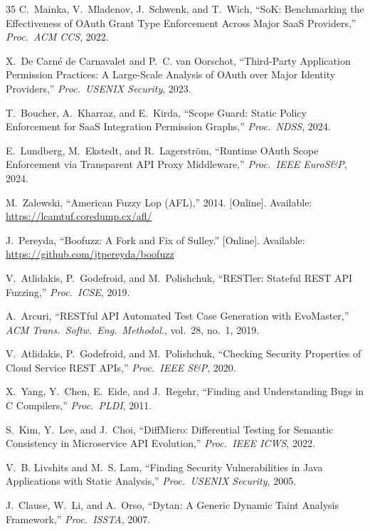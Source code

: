 \documentclass[conference]{IEEEtran}
\begin{document}
\begin{thebibliography}{35}
C.~Mainka, V.~Mladenov, J.~Schwenk, and T.~Wich, ``SoK: Benchmarking
the Effectiveness of OAuth Grant Type Enforcement Across Major SaaS
Providers,'' \textit{Proc.\ ACM CCS}, 2022.

X.~De Carné de Carnavalet and P.~C. van Oorschot, ``Third-Party
Application Permission Practices: A Large-Scale Analysis of OAuth
over Major Identity Providers,'' \textit{Proc.\ USENIX Security},
2023.

T.~Boucher, A.~Kharraz, and E.~Kirda, ``Scope Guard: Static Policy
Enforcement for SaaS Integration Permission Graphs,''
\textit{Proc.\ NDSS}, 2024.

E.~Lundberg, M.~Ekstedt, and R.~Lagerstr\"{o}m, ``Runtime OAuth
Scope Enforcement via Transparent API Proxy Middleware,''
\textit{Proc.\ IEEE EuroS\&P}, 2024.

M.~Zalewski, ``American Fuzzy Lop (AFL),'' 2014. [Online]. Available:
\url{https://lcamtuf.coredump.cx/afl/}

J.~Pereyda, ``Boofuzz: A Fork and Fix of Sulley.'' [Online].
Available: \url{https://github.com/jtpereyda/boofuzz}

V.~Atlidakis, P.~Godefroid, and M.~Polishchuk, ``RESTler: Stateful
REST API Fuzzing,'' \textit{Proc.\ ICSE}, 2019.

A.~Arcuri, ``RESTful API Automated Test Case Generation with
EvoMaster,'' \textit{ACM Trans.\ Softw.\ Eng.\ Methodol.},
vol.~28, no.~1, 2019.

V.~Atlidakis, P.~Godefroid, and M.~Polishchuk, ``Checking Security
Properties of Cloud Service REST APIs,'' \textit{Proc.\ IEEE S\&P},
2020.

X.~Yang, Y.~Chen, E.~Eide, and J.~Regehr, ``Finding and
Understanding Bugs in C Compilers,'' \textit{Proc.\ PLDI}, 2011.

S.~Kim, Y.~Lee, and J.~Choi, ``DiffMicro: Differential Testing for
Semantic Consistency in Microservice API Evolution,''
\textit{Proc.\ IEEE ICWS}, 2022.

V.~B. Livshits and M.~S. Lam, ``Finding Security Vulnerabilities in
Java Applications with Static Analysis,'' \textit{Proc.\ USENIX
Security}, 2005.

J.~Clause, W.~Li, and A.~Orso, ``Dytan: A Generic Dynamic Taint
Analysis Framework,'' \textit{Proc.\ ISSTA}, 2007.


\end{thebibliography}
\end{document}
